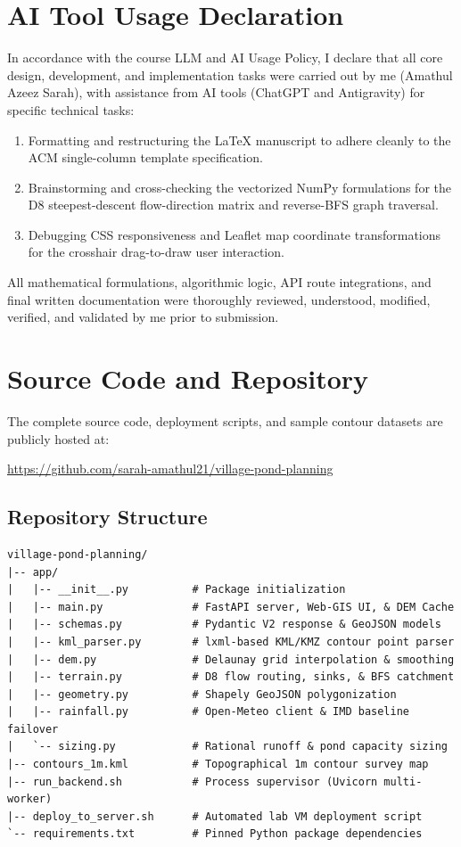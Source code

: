 \documentclass[manuscript,screen]{acmart}
\begin{document}
\section{AI Tool Usage Declaration}
\label{sec:ai-usage}
In accordance with the course LLM and AI Usage Policy, I declare that all core design, development, and implementation tasks were carried out by me (Amathul Azeez Sarah), with assistance from AI tools (ChatGPT and Antigravity) for specific technical tasks:
\begin{enumerate}
    \item Formatting and restructuring the LaTeX manuscript to adhere cleanly to the ACM single-column template specification.
    \item Brainstorming and cross-checking the vectorized NumPy formulations for the D8 steepest-descent flow-direction matrix and reverse-BFS graph traversal.
    \item Debugging CSS responsiveness and Leaflet map coordinate transformations for the crosshair drag-to-draw user interaction.
\end{enumerate}
All mathematical formulations, algorithmic logic, API route integrations, and final written documentation were thoroughly reviewed, understood, modified, verified, and validated by me prior to submission.

\appendix

\section{Source Code and Repository}
The complete source code, deployment scripts, and sample contour datasets are publicly hosted at:
\begin{center}
\url{https://github.com/sarah-amathul21/village-pond-planning}
\end{center}

\subsection{Repository Structure}
\begin{lstlisting}
village-pond-planning/
|-- app/
|   |-- __init__.py          # Package initialization
|   |-- main.py              # FastAPI server, Web-GIS UI, & DEM Cache
|   |-- schemas.py           # Pydantic V2 response & GeoJSON models
|   |-- kml_parser.py        # lxml-based KML/KMZ contour point parser
|   |-- dem.py               # Delaunay grid interpolation & smoothing
|   |-- terrain.py           # D8 flow routing, sinks, & BFS catchment
|   |-- geometry.py          # Shapely GeoJSON polygonization
|   |-- rainfall.py          # Open-Meteo client & IMD baseline failover
|   `-- sizing.py            # Rational runoff & pond capacity sizing
|-- contours_1m.kml          # Topographical 1m contour survey map
|-- run_backend.sh           # Process supervisor (Uvicorn multi-worker)
|-- deploy_to_server.sh      # Automated lab VM deployment script
`-- requirements.txt         # Pinned Python package dependencies
\end{lstlisting}
\end{document}
